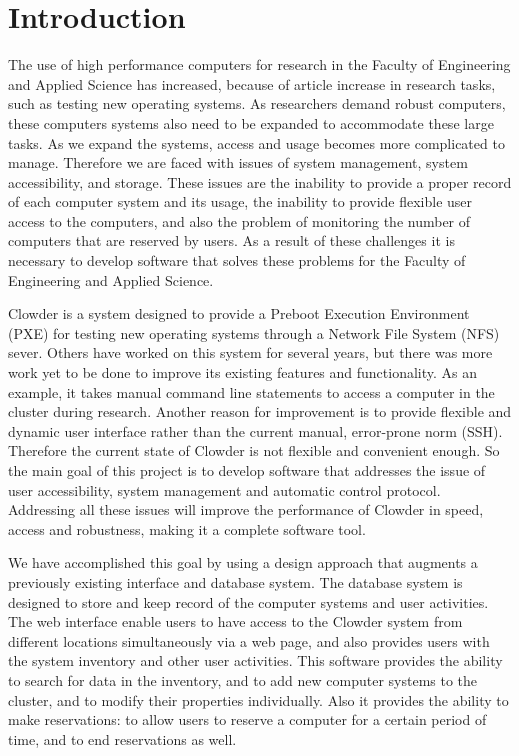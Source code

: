 \chapter{Introduction}
\label{chap:intro}

The use of high performance computers for  research in the Faculty of Engineering  and Applied Science has increased, because of article increase in research tasks, such as testing new operating systems. As researchers demand robust computers, these computers systems also need to be expanded to accommodate these large tasks. As we expand the systems, access and usage  becomes more complicated to manage. Therefore we are faced with issues of system management, system accessibility, and storage. These issues are the inability to provide  a proper record of each computer system and its usage, the inability to provide flexible user access to the computers, and also the problem of monitoring the number of computers that are reserved by users. As a result of these challenges it is necessary to develop software that solves these problems for the Faculty of Engineering and Applied Science. 


Clowder is a system designed to provide a Preboot Execution Environment (PXE) for testing new operating systems through a Network File System (NFS) sever. Others have worked on this system for several years, but there was more work yet to be done to improve its existing features and functionality. As an example, it takes manual command line statements to access  a computer in the cluster during research. Another reason for improvement is to provide flexible and dynamic user interface rather than the current manual, error-prone norm (SSH). Therefore the current state of Clowder is not flexible and convenient enough. So the main goal of this project is to develop software that addresses the issue of user accessibility, system management and automatic control protocol. Addressing all these issues will improve the performance of Clowder in speed, access and robustness, making it a complete software tool. 
	
	
We have accomplished this goal by using a design approach that augments a previously existing interface and database system. The database system is designed to store and keep record of the computer systems and user activities. The web interface enable users to have access to the Clowder system from different locations simultaneously via a web page, and also provides users with the system inventory and other user activities. This  software provides the ability to search for data in the inventory, and to add new computer systems to the cluster, and to modify their properties individually. Also it provides the ability to make reservations: to allow users to reserve a computer for a certain period of time, and to end reservations as well.    
	

